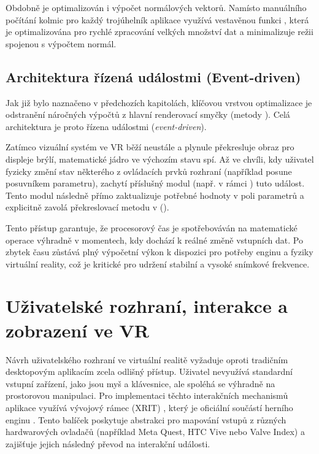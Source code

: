 \documentclass[czech, kiv, sem, he, iso690alph, pdf,viewonly]{fasthesis}
\begin{document}
Obdobně je optimalizován i výpočet normálových vektorů. 
Namísto manuálního počítání kolmic pro každý trojúhelník aplikace využívá vestavěnou funkci , která je optimalizována pro rychlé zpracování velkých množství dat 
a minimalizuje režii spojenou s výpočtem normál.

\section{Architektura řízená událostmi (Event-driven)}
Jak již bylo naznačeno v předchozích kapitolách, klíčovou vrstvou optimalizace je odstranění náročných výpočtů z hlavní renderovací smyčky (metody ). 
Celá architektura je proto řízena událostmi (\textit{event-driven}). 

Zatímco vizuální systém ve VR běží neustále a plynule překresluje obraz pro displeje brýlí, matematické jádro ve výchozím stavu spí. 
Až ve chvíli, kdy uživatel fyzicky změní stav některého z ovládacích prvků rozhraní (například posune posuvníkem parametru), zachytí příslušný modul (např.  v rámci ) 
tuto událost. Tento modul následně přímo zaktualizuje potřebné hodnoty v poli parametrů a explicitně zavolá překreslovací metodu v  (). 

Tento přístup garantuje, že procesorový čas je spotřebováván na matematické operace výhradně v momentech, kdy dochází k reálné změně vstupních dat. 
Po zbytek času zůstává plný výpočetní výkon k dispozici pro potřeby enginu a fyziky virtuální reality, což je kritické pro udržení stabilní a vysoké snímkové frekvence.



\chapter{Uživatelské rozhraní, interakce a zobrazení ve VR}
Návrh uživatelského rozhraní ve virtuální realitě vyžaduje oproti tradičním desktopovým aplikacím zcela odlišný přístup. 
Uživatel nevyužívá standardní vstupní zařízení, jako jsou myš a klávesnice, ale spoléhá se výhradně na prostorovou manipulaci. 
Pro implementaci těchto interakčních mechanismů aplikace využívá vývojový rámec  (XRIT) \cite{unity_xr_manual}, 
který je oficiální součástí herního enginu . Tento balíček poskytuje abstrakci pro mapování vstupů z různých hardwarových ovladačů (například Meta Quest, HTC Vive nebo Valve Index) 
a zajišťuje jejich následný převod na interakční události.
\end{document}
